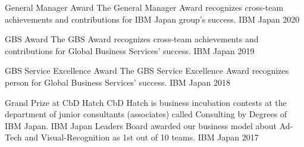 



\begin{cvhonors}

  \cvhonor
    {General Manager Award} %
    {The General Manager Award recognizes cross-team achievements and contributions for IBM Japan group's success.} %
    {IBM Japan} %
    {2020} %

  \cvhonor
    {GBS Award} %
    {The GBS Award recognizes cross-team achievements and contributions for Global Business Services' success. } %
    {IBM Japan} %
    {2019} %

  \cvhonor
    {GBS Service Excellence Award} %
    {The GBS Service Excellence Award recognizes person for Global Business Services' success.} %
    {IBM Japan} %
    {2018} %

  \cvhonor
    {Grand Prize at CbD Hatch} %
    {CbD Hatch is business incubation contests at the department of junior consultants (associates) called Consulting by Degrees of IBM Japan. IBM Japan Leaders Board awarded our business model about Ad-Tech and Visual-Recognition as 1st out of 10 teams.} %
    {IBM Japan} %
    {2017} %


\end{cvhonors}




